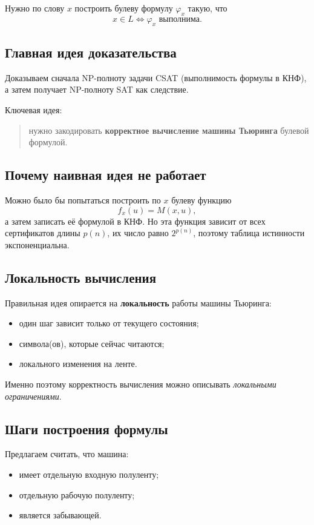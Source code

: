 \documentclass[12pt,a4paper]{article}
\theoremstyle{definition}
\theoremstyle{plain}
\begin{document}
Нужно по слову $x$ построить булеву формулу $\varphi_x$ такую, что
\[
x\in L \iff \varphi_x \text{ выполнима}.
\]

\subsection{Главная идея доказательства}
Доказываем сначала NP-полноту задачи \textsc{CSAT} (выполнимость формулы в КНФ), а затем получает NP-полноту \textsc{SAT} как следствие.

Ключевая идея:
\begin{quote}
нужно закодировать \textbf{корректное вычисление машины Тьюринга} булевой формулой.
\end{quote}

\subsection{Почему наивная идея не работает}
Можно было бы попытаться построить по $x$ булеву функцию
\[
f_x(u)=M(x,u),
\]
а затем записать её формулой в КНФ. Но эта функция зависит от всех сертификатов длины $p(n)$, их число равно $2^{p(n)}$, поэтому таблица истинности экспоненциальна.

\subsection{Локальность вычисления}
Правильная идея опирается на \textbf{локальность} работы машины Тьюринга:
\begin{itemize}
\item один шаг зависит только от текущего состояния;
\item символа(ов), которые сейчас читаются;
\item локального изменения на ленте.
\end{itemize}

Именно поэтому корректность вычисления можно описывать \emph{локальными ограничениями}.

\subsection{Шаги построения формулы}
Предлагаем считать, что машина:
\begin{itemize}
\item имеет отдельную входную полуленту;
\item отдельную рабочую полуленту;
\item является забывающей.
\end{itemize}
\end{document}
